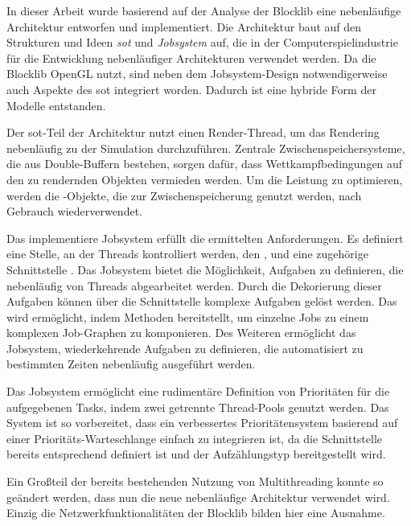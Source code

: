 In dieser Arbeit wurde basierend auf der Analyse der Blocklib eine nebenläufige Architektur entworfen und implementiert. Die Architektur baut auf den Strukturen und Ideen \emph{\acf{sot}} und \emph{Jobsystem} auf, die in der Computerspielindustrie für die Entwicklung nebenläufiger Architekturen verwendet werden. Da die Blocklib OpenGL nutzt, sind neben dem Jobsystem-Design notwendigerweise auch Aspekte des \ac{sot} integriert worden. Dadurch ist eine hybride Form der Modelle entstanden.

Der \ac{sot}-Teil der Architektur nutzt einen Render-Thread, um das Rendering nebenläufig zu der Simulation durchzuführen. Zentrale Zwischenspeichersysteme, die aus Double-Buffern bestehen, sorgen dafür, dass Wettkampfbedingungen auf den zu rendernden Objekten vermieden werden. Um die Leistung zu optimieren, werden die \classRenderedRenderable{}-Objekte, die zur Zwischenspeicherung genutzt werden, nach Gebrauch wiederverwendet.

Das implementiere Jobsystem erfüllt die ermittelten Anforderungen. Es definiert eine Stelle, an der Threads kontrolliert werden, den \classBlocklibExecutor{}, und eine zugehörige Schnittstelle \classBlocklibExecutorService{}. Das Jobsystem bietet die Möglichkeit, Aufgaben zu definieren, die nebenläufig von Threads abgearbeitet werden. Durch die Dekorierung dieser Aufgaben können über die Schnittstelle \classCompletionStage{} komplexe Aufgaben gelöst werden. Das wird ermöglicht, indem \classCompletionStage{} Methoden bereitstellt, um einzelne Jobs zu einem komplexen Job-Graphen zu komponieren. Des Weiteren ermöglicht das Jobsystem, wiederkehrende Aufgaben zu definieren, die automatisiert zu bestimmten Zeiten nebenläufig ausgeführt werden.

Das Jobsystem ermöglicht eine rudimentäre Definition von Prioritäten für die aufgegebenen Tasks, indem zwei getrennte Thread-Pools genutzt werden. Das System ist so vorbereitet, dass ein verbessertes Prioritätensystem basierend auf einer Prioritäts-Warteschlange einfach zu integrieren ist, da die Schnittstelle \classBlocklibExecutorService{} bereits entsprechend definiert ist und der Aufzählungstyp \classTaskPriority{} bereitgestellt wird.

Ein Großteil der bereits bestehenden Nutzung von Multithreading konnte so geändert werden, dass nun die neue nebenläufige Architektur verwendet wird. Einzig die Netzwerkfunktionalitäten der Blocklib bilden hier eine Ausnahme.

